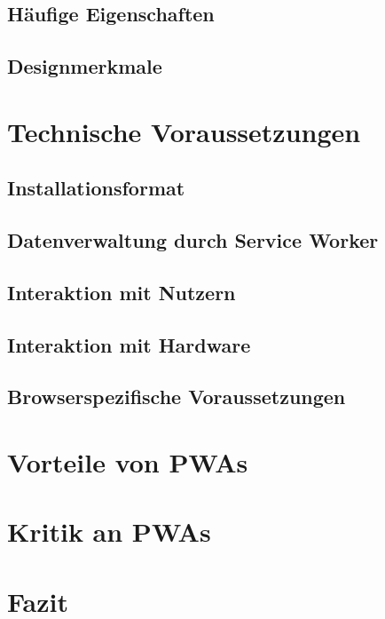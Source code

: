 \documentclass[11pt, parskip=half]{scrartcl}       %
\begin{document}
\subsection{Häufige Eigenschaften}

\subsection{Designmerkmale}


\section{Technische Voraussetzungen}

\subsection{Installationsformat}

\subsection{Datenverwaltung durch Service Worker}

\subsection{Interaktion mit Nutzern}

\subsection{Interaktion mit Hardware}

\subsection{Browserspezifische Voraussetzungen}


\section{Vorteile von PWAs}

\section{Kritik an PWAs}


\section{Fazit}

\newpage

\printbibliography
\end{document}
